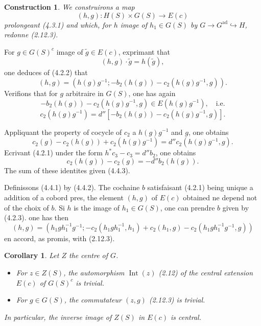 \documentclass[11pt,a4paper]{article}
\theoremstyle{plain}
\newtheorem{corollary}[theorem]{Corollary}
\newtheorem{construction}[theorem]{Construction}
\theoremstyle{definition}
\DeclareMathOperator{\ad}{ad}
\DeclareMathOperator{\Int}{Int}
\begin{document}
\begin{construction}\label{4.4}
We construirons a map
\begin{equation}\label{4.4.1}
(h, g) : H(S) \times G(S) \to E(c)
\end{equation}
prolongeant (4.3.1) and which, for $h$ image of $h_1 \in G(S)$ by $G \to G^{\ad} \hookrightarrow H$, redonne (2.12.3).
\end{construction}

For $g \in G(S)^c$ image of $\tilde{g} \in E(c)$, exprimant that
\[
(h, g) \cdot \tilde{g} = h(\tilde{g}),
\]
one deduces of (4.2.2) that
\begin{equation}\label{4.4.2}
(h, g) = (h(g) g^{-1}; -b_2(h(g)) - c_2(h(g) g^{-1}, g)).
\end{equation}
Verifions that for $g$ arbitraire in $G(S)$, one has again
\[
-b_2(h(g)) - c_2(h(g) g^{-1}, g) \in E(h(g) g^{-1}), \quad \text{i.e.}
\]
\begin{equation}\label{4.4.3}
c_2(h(g) g^{-1}) = d''[-b_2(h(g)) - c_2(h(g) g^{-1}, g)].
\end{equation}

Appliquant the property of cocycle of $c_2$ a $h(g) g^{-1}$ and $g$, one obtains
\[
c_2(g) - c_2(h(g)) + c_2(h(g) g^{-1}) = d'' c_2(h(g) g^{-1}, g).
\]
Ecrivant (4.2.1) under the form $h^* c_3 - c_3 = d'' b_2$, one obtains
\[
c_2(h(g)) - c_2(g) = -d'' b_2(h(g)).
\]
The sum of these identites given (4.4.3).

Definissons (4.4.1) by (4.4.2). The cochaine $b$ satisfaisant (4.2.1) being unique a addition of a cobord pres, the element $(h, g)$ of $E(c)$ obtained ne depend not of the choix of $b$. Si $h$ is the image of $h_1 \in G(S)$, one can prendre $b$ given by (4.2.3). one has then
\[
(h, g) = (h_1 g h_1^{-1} g^{-1}; -c_2(h_1 g h_1^{-1}, h_1) + c_2(h_1, g) - c_2(h_1 g h_1^{-1} g^{-1}, g))
\]
en accord, as promis, with (2.12.3).

\begin{corollary}\label{4.5}
Let $Z$ the centre of $G$.
\begin{itemize}
\item[(i)] For $z \in Z(S)$, the automorphism $\Int(z)$ (2.12) of the central extension $E(c)$ of $G(S)^c$ is trivial.
\item[(ii)] For $g \in G(S)$, the commutateur $(z, g)$ (2.12.3) is trivial.
\end{itemize}
In particular, the inverse image of $Z(S)$ in $E(c)$ is central.
\end{corollary}
\end{document}
